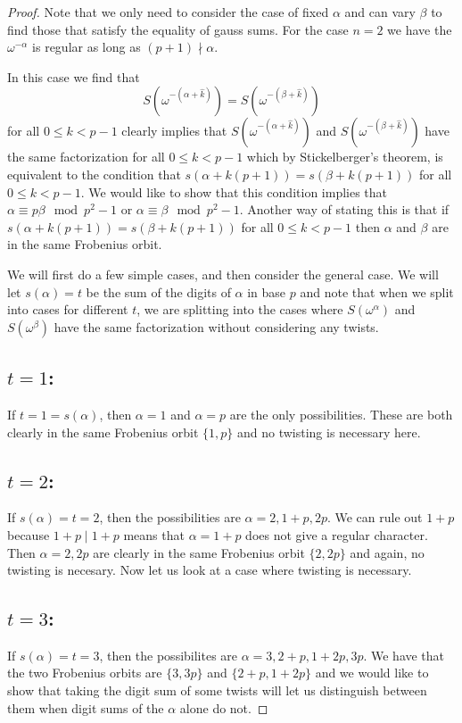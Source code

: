 \begin{proof}
Note that we only need to consider the case of fixed $\alpha$ and can vary $\beta$ to find those that satisfy the equality of gauss sums. 
For the case $n=2$ we have the $\omega^{-\alpha}$ is regular as long as $(p+1)\nmid \alpha$.

In this case we find that \[S(\omega^{-(\alpha + \hat{k})}) = S(\omega^{-(\beta + \hat{k})})\] for all $0 \leq k < p-1$ clearly implies that $S(\omega^{-(\alpha+\hat{k})})$ and $S(\omega^{-(\beta + \hat{k})})$ have the same factorization for all $0 \leq k < p-1$ which by Stickelberger's theorem, is equivalent to the condition that $s(\alpha + k(p+1)) = s(\beta + k(p+1))$ for all $0 \leq k < p-1$. 
We would like to show that this condition implies that $\alpha \equiv p \beta \mod p^2 -1$ or $\alpha \equiv \beta \mod p^2 - 1$. 
Another way of stating this is that if $s(\alpha + k(p+1)) = s(\beta+k(p+1))$ for all $0 \leq k < p-1$ then $\alpha$ and $\beta$ are in the same Frobenius orbit.

We will first do a few simple cases, and then consider the general case.
We will let $s(\alpha) = t$ be the sum of the digits of $\alpha$ in base $p$ and note that when we split into cases for different $t$, we are splitting into the cases where $S(\omega^\alpha)$ and  $S(\omega^\beta)$ have the same factorization without considering any twists.
\\

\subsection{$t = 1$:} If $t = 1 = s(\alpha)$, then $\alpha = 1$ and $\alpha = p$ are the only possibilities. 
These are both clearly in the same Frobenius orbit $\{1,p\}$ and no twisting is necessary here.
\\

\subsection{$t = 2$:} If $s(\alpha) = t = 2$, then the possibilities are $\alpha = 2, 1+p, 2p$. 
We can rule out $1+p$ because $1+p \mid 1+p$ means that $\alpha = 1+p$ does not give a regular character. 
Then $\alpha = 2, 2p$ are clearly in the same Frobenius orbit $\{2,2p\}$ and again, no twisting is necesary. 
Now let us look at a case where twisting is necessary.
\\

\subsection{$t = 3$:} If $s(\alpha) = t= 3$, then the possibilites are $\alpha = 3,2+p,1+2p,3p$. 
We have that the two Frobenius orbits are $\{3,3p\}$ and $\{2+p, 1+2p\}$ and we would like to show that taking the digit sum of some twists will let us distinguish between them when digit sums of the $\alpha$ alone do not.


\end{proof}
